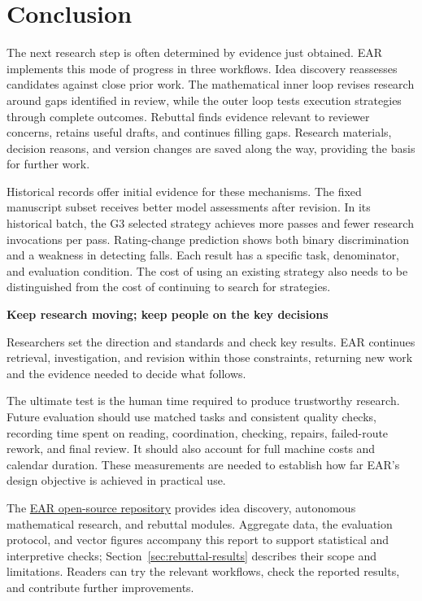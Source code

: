 \FloatBarrier
\clearpage
\section{Conclusion}
\label{sec:conclusion}
The next research step is often determined by evidence just obtained. EAR implements this mode of progress in three workflows. Idea discovery reassesses candidates against close prior work. The mathematical inner loop revises research around gaps identified in review, while the outer loop tests execution strategies through complete outcomes. Rebuttal finds evidence relevant to reviewer concerns, retains useful drafts, and continues filling gaps. Research materials, decision reasons, and version changes are saved along the way, providing the basis for further work.

Historical records offer initial evidence for these mechanisms. The fixed manuscript subset receives better model assessments after revision. In its historical batch, the G3 selected strategy achieves more passes and fewer research invocations per pass. Rating-change prediction shows both binary discrimination and a weakness in detecting falls. Each result has a specific task, denominator, and evaluation condition. The cost of using an existing strategy also needs to be distinguished from the cost of continuing to search for strategies.

\begin{insight}
\textbf{Keep research moving; keep people on the key decisions}\par
Researchers set the direction and standards and check key results. EAR continues retrieval, investigation, and revision within those constraints, returning new work and the evidence needed to decide what follows.
\end{insight}

The ultimate test is the human time required to produce trustworthy research. Future evaluation should use matched tasks and consistent quality checks, recording time spent on reading, coordination, checking, repairs, failed-route rework, and final review. It should also account for full machine costs and calendar duration. These measurements are needed to establish how far EAR's design objective is achieved in practical use.

The \href{https://github.com/liyingze07-svg/EffectiveAutoResearch-EAR-}{EAR open-source repository} provides idea discovery, autonomous mathematical research, and rebuttal modules. Aggregate data, the evaluation protocol, and vector figures accompany this report to support statistical and interpretive checks; Section~\ref{sec:rebuttal-results} describes their scope and limitations. Readers can try the relevant workflows, check the reported results, and contribute further improvements.
